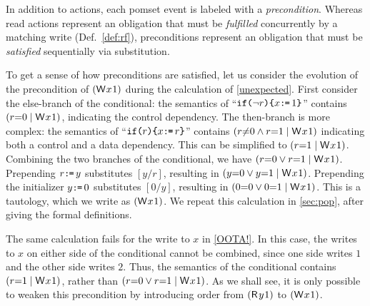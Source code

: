 In addition to actions, each pomset event is labeled with a
\emph{precondition}.  Whereas read actions represent an obligation that must
be \emph{fulfilled} concurrently by a matching write (Def.~\ref{def:rf}), preconditions represent an obligation that must be
\emph{satisfied} sequentially via substitution.

To get a sense of how preconditions are satisfied, let us consider the
evolution of the precondition of $(\DW{x}{1})$ during the calculation of
\eqref{unexpected}.
First consider the else-branch of the conditional: the semantics of
``${\texttt{if}\allowbreak\texttt{(}\lnot r\texttt{)}\allowbreak\texttt{\{} x\texttt{:}\mkern-1mu\texttt{=}\,1 \texttt{\}}}$'' contains $(r{=}0 \mid \DW{x}{1})$,
indicating the control dependency.  The then-branch is more complex: the
semantics of ``${\texttt{if}\allowbreak\texttt{(}r\texttt{)}\allowbreak\texttt{\{} x\texttt{:}\mkern-1mu\texttt{=}\, r \texttt{\}}}$'' contains
$(r{\neq}0 \land r{=}1 \mid \DW{x}{1})$ indicating both a control and a data
dependency.  This can be simplified to $(r{=}1 \mid \DW{x}{1})$.  Combining
the two branches of the conditional, we have
$(r{=}0 \lor r{=}1 \mid \DW{x}{1})$.  Prepending $r\texttt{:}\mkern-1mu\texttt{=}\, y$ substitutes
$[y/r]$, resulting in $(y{=}0 \lor y{=}1 \mid \DW{x}{1})$.  Prepending the
initializer $y\texttt{:}\mkern-1mu\texttt{=}\, 0$ substitutes $[0/y]$, resulting in
$(0{=}0 \lor 0{=}1 \mid \DW{x}{1})$.  This is a tautology, which we write as
$(\DW{x}{1})$.   We repeat this calculation in \textsection\ref{sec:pop},
after giving the formal definitions.

The same calculation fails for the write to $x$ in \eqref{OOTA!}.  In this
case, the writes to $x$ on either side of the conditional cannot be combined,
since one side writes $1$ and the other side writes $2$.  Thus, the semantics
of the conditional contains $(r{=}1 \mid \DW{x}{1})$, rather than
$(r{=}0 \lor r{=}1 \mid \DW{x}{1})$.  As we shall see, it is only possible to
weaken this precondition by introducing order from $(\DR{y}{1})$ to
$(\DW{x}{1})$.

